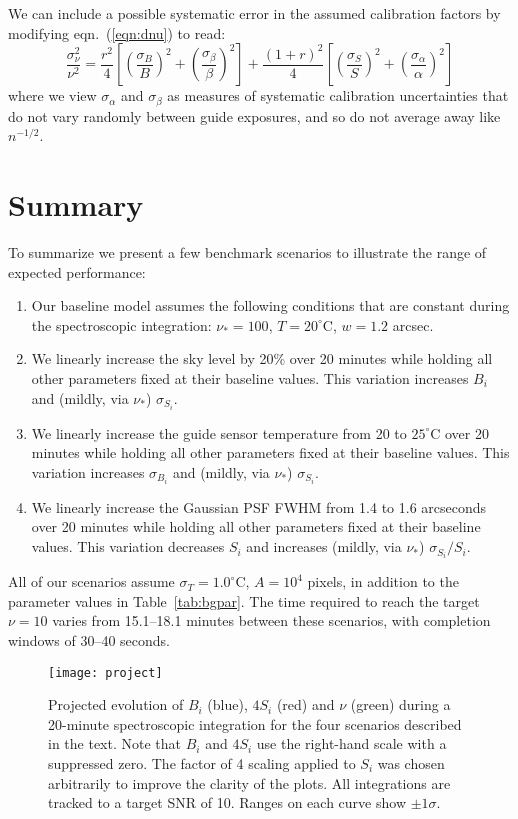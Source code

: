 \documentclass[11pt]{article}
\providecommand{\eqn}[1]{eqn.~(\ref{eqn:#1})}
\providecommand{\tab}[1]{Table~\ref{tab:#1}}
\begin{document}
We can include a possible systematic error in the assumed calibration factors by modifying \eqn{dnu} to read:
\begin{equation}
\frac{\sigma_\nu^2}{\nu^2} = \frac{r^2}{4} \left[\left(\frac{\sigma_B}{B}\right)^2 + \left(\frac{\sigma_\beta}{\beta}\right)^2\right]
+ \frac{(1+r)^2}{4} \left[\left(\frac{\sigma_S}{S}\right)^2 + \left(\frac{\sigma_\alpha}{\alpha}\right)^2\right]
\label{eqn:calib_error}
\end{equation}
where we view $\sigma_\alpha$ and $\sigma_\beta$ as measures of systematic calibration uncertainties that do not vary randomly between guide exposures, and so do not average away like $n^{-1/2}$.

\section{Summary}

To summarize we present a few benchmark scenarios to illustrate the range of expected performance:
\begin{enumerate}
\item Our baseline model assumes the following conditions that are constant during the spectroscopic integration: $\nu_{\ast} = 100$, $T = 20^\circ$C, $w = 1.2$ arcsec.
\item We linearly increase the sky level by 20\% over 20 minutes while holding all other parameters fixed at their baseline values. This variation increases $B_i$ and (mildly, via $\nu_{\ast}$) $\sigma_{S_i}$.
\item We linearly increase the guide sensor temperature from 20 to $25^\circ$C over 20 minutes while holding all other parameters fixed at their baseline values. This variation increases $\sigma_{B_i}$ and (mildly, via $\nu_{\ast}$) $\sigma_{S_i}$.
\item We linearly increase the Gaussian PSF FWHM from 1.4 to 1.6 arcseconds over 20 minutes while holding all other parameters fixed at their baseline values. This variation decreases $S_i$ and increases (mildly, via $\nu_{\ast}$) $\sigma_{S_i}/S_i$.
\end{enumerate}
All of our scenarios assume $\sigma_T = 1.0^\circ$C, $A = 10^4$ pixels, in addition to the parameter values in \tab{bgpar}. The time required to reach the target $\nu = 10$ varies from 15.1--18.1 minutes between these scenarios, with completion windows of 30--40 seconds.

\begin{figure}[htb]
\begin{center}
\texttt{[image: project]}
\caption{Projected evolution of $B_i$ (blue), $4 S_i$ (red) and $\nu$ (green) during a 20-minute spectroscopic integration for the four scenarios described in the text. Note that $B_i$ and $4 S_i$ use the right-hand scale with a suppressed zero.  The factor of 4 scaling applied to $S_i$ was chosen arbitrarily to improve the clarity of the plots. All integrations are tracked to a target SNR of 10. Ranges on each curve show $\pm 1\sigma$.}
\label{fig:project}
\end{center}
\end{figure}
\end{document}

